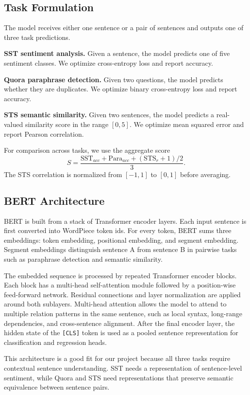 \documentclass{article}
\begin{document}
\subsection{Task Formulation}

The model receives either one sentence or a pair of sentences and outputs one of three task predictions.

\textbf{SST sentiment analysis.} Given a sentence, the model predicts one of five sentiment classes. We optimize cross-entropy loss and report accuracy.

\textbf{Quora paraphrase detection.} Given two questions, the model predicts whether they are duplicates. We optimize binary cross-entropy loss and report accuracy.

\textbf{STS semantic similarity.} Given two sentences, the model predicts a real-valued similarity score in the range $[0,5]$. We optimize mean squared error and report Pearson correlation.

For comparison across tasks, we use the aggregate score
\[
S = \frac{\text{SST}_{acc} + \text{Para}_{acc} + (\text{STS}_{r}+1)/2}{3}.
\]
The STS correlation is normalized from $[-1,1]$ to $[0,1]$ before averaging.

\subsection{BERT Architecture}

BERT is built from a stack of Transformer encoder layers. Each input sentence is first converted into WordPiece token ids. For every token, BERT sums three embeddings: token embedding, positional embedding, and segment embedding. Segment embeddings distinguish sentence A from sentence B in pairwise tasks such as paraphrase detection and semantic similarity.

The embedded sequence is processed by repeated Transformer encoder blocks. Each block has a multi-head self-attention module followed by a position-wise feed-forward network. Residual connections and layer normalization are applied around both sublayers. Multi-head attention allows the model to attend to multiple relation patterns in the same sentence, such as local syntax, long-range dependencies, and cross-sentence alignment. After the final encoder layer, the hidden state of the \texttt{[CLS]} token is used as a pooled sentence representation for classification and regression heads.

This architecture is a good fit for our project because all three tasks require contextual sentence understanding. SST needs a representation of sentence-level sentiment, while Quora and STS need representations that preserve semantic equivalence between sentence pairs.
\end{document}
